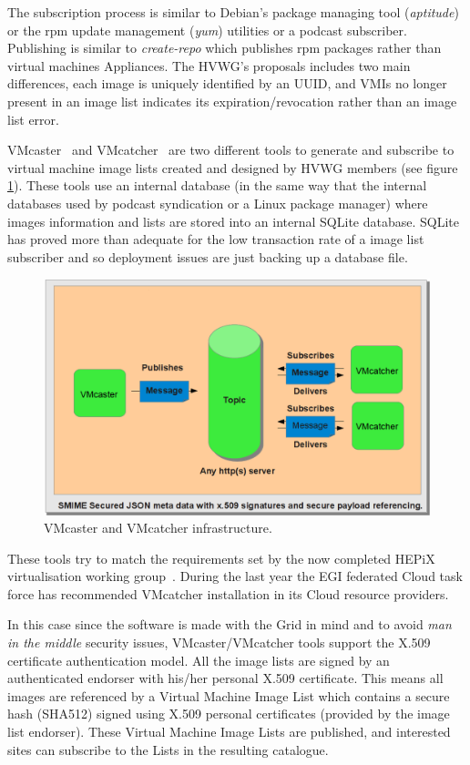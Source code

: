 \documentclass{cai}
\begin{document}
The subscription process is similar to Debian's package managing tool (\textit{aptitude}) or the rpm update management (\textit{yum}) utilities or a podcast subscriber. 
Publishing is similar to \textit{create-repo} which publishes rpm packages rather than virtual machines Appliances. 
The HVWG's proposals includes two main differences, each image is uniquely identified by an UUID, and VMIs no longer present in an image list indicates its expiration/revocation rather than an image list error.


VMcaster~\cite{vmcaster} and VMcatcher~\cite{vmcatcher} are two different tools to generate and subscribe to virtual machine image lists created and designed by HVWG members (see figure \ref{fig:infrastructure}).
These tools use an internal database (in the same way that the internal databases used by podcast syndication or a Linux package manager) where images information and lists are stored into an internal SQLite database.
SQLite has proved more than adequate for the low transaction rate of a image list subscriber and so deployment issues are just backing up a database file.

\begin{figure}
\centering
\includegraphics[width=1\textwidth]{vmcaster_vmcatcher.png}
\caption{VMcaster and VMcatcher infrastructure.}
\label{fig:infrastructure}
\end{figure}

These tools try to match the requirements set by the now completed HEPiX virtualisation working group~\cite{hepix}.
During the last year the EGI federated Cloud task force has recommended VMcatcher installation in its Cloud resource providers.

In this case since the software is made with the Grid in mind and to avoid {\it man in the middle} security issues, VMcaster/VMcatcher tools support the X.509 certificate authentication model.
All the image lists are signed by an authenticated endorser with his/her personal X.509 certificate. 
This means all images are referenced by a Virtual Machine Image List which contains a secure hash (SHA512) signed using X.509 personal certificates (provided by the image list endorser). 
These Virtual Machine Image Lists are published, and interested sites can subscribe to the Lists in the resulting catalogue. 
\end{document}
